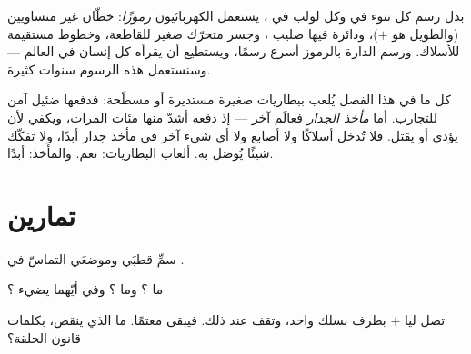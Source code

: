 \begin{remark}\label{rem:g3:first-electric-circuit:symbols}
بدل رسم كل نتوء في  وكل لولب في ، يستعمل
الكهربائيون \emph{رموزًا}: خطّان غير متساويين  (والطويل
هو $+$)، ودائرة فيها صليب ، وجسر متحرّك صغير للقاطعة،
وخطوط مستقيمة للأسلاك. ورسم الدارة بالرموز أسرع رسمًا، ويستطيع
أن يقرأه كل إنسان في العالم --- وسنستعمل هذه الرسوم سنوات كثيرة.
\end{remark}

\begin{remark}\label{rem:g3:first-electric-circuit:safety}
كل ما في هذا الفصل يُلعب ببطاريات صغيرة مستديرة أو مسطّحة: فدفعها
ضئيل آمن للتجارب. أما \emph{مأخذ الجدار} فعالَم آخر --- إذ دفعه
أشدّ منها مئات المرات، ويكفي لأن يؤذي أو يقتل. فلا تُدخل أسلاكًا
ولا أصابع ولا أي شيء آخر في مأخذ جدار أبدًا، ولا تفكّك شيئًا
يُوصَل به. ألعاب البطاريات: نعم. والمأخذ: أبدًا.
\end{remark}

\section{تمارين}

\begin{exercise}[$\star$]\label{exo:g3:first-electric-circuit:1}
سمِّ قطبَي  وموضعَي التماسّ في .
\end{exercise}

\begin{exercise}[$\star$]\label{exo:g3:first-electric-circuit:2}
ما ؟ وما ؟ وفي أيّهما يضيء
؟
\end{exercise}

\begin{exercise}[$\star$]\label{exo:g3:first-electric-circuit:3}
تصل ليا   $+$ بطرف  بسلك واحد، وتقف عند ذلك.
فيبقى  معتمًا. ما الذي ينقص، بكلمات قانون الحلقة؟
\end{exercise}

